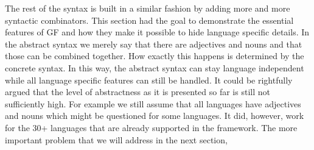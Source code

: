 \documentclass[output=paper]{LSP/langsci}
\begin{document}
\ili{}
The\ili{} rest\ili{} of\ili{} the\ili{} syntax\ili{} is\ili{} built\ili{} in\ili{} a\ili{} similar\ili{} fashion\ili{} by\ili{} adding\ili{} more\ili{} \ili{}
and\ili{} more\ili{} syntactic\ili{} combinators\ili{}.\ili{} This\ili{} section\ili{} had\ili{} the\ili{} goal\ili{} to\ili{} demonstrate\ili{}
the\ili{} essential\ili{} features\ili{} of\ili{} GF\ili{} and\ili{} how\ili{} they\ili{} make\ili{} it\ili{} possible\ili{} to\ili{} \ili{}
hide\ili{} language\ili{} specific\ili{} details\ili{}.\ili{} In\ili{} the\ili{} abstract\ili{} syntax\ili{} we\ili{} merely\ili{} \ili{}
say\ili{} that\ili{} there\ili{} are\ili{} adjectives\ili{} and\ili{} nouns\ili{} and\ili{} that\ili{} those\ili{} \ili{}
can\ili{} be\ili{} combined\ili{} together\ili{}.\ili{} How\ili{} exactly\ili{} this\ili{} happens\ili{} is\ili{} determined\ili{} by\ili{} \ili{}
the\ili{} concrete\ili{} syntax\ili{}.\ili{} In\ili{} this\ili{} way\ili{},\ili{} the\ili{} abstract\ili{} syntax\ili{} \ili{}
can\ili{} stay\ili{} language\ili{} independent\ili{} while\ili{} all\ili{} language\ili{} specific\ili{} features\ili{} \ili{}
can\ili{} still\ili{} be\ili{} handled\ili{}.\ili{} It\ili{} could\ili{} be\ili{} rightfully\ili{} argued\ili{} that\ili{} \ili{}
the\ili{} level\ili{} of\ili{} abstractness\ili{} as\ili{} it\ili{} is\ili{} presented\ili{} so\ili{} far\ili{} is\ili{} still\ili{} not\ili{} \ili{}
sufficiently\ili{} high\ili{}.\ili{} For\ili{} example\ili{} we\ili{} still\ili{} assume\ili{} that\ili{} all\ili{} languages\ili{} \ili{}
have\ili{} adjectives\ili{} and\ili{} nouns\ili{} which\ili{} might\ili{} be\ili{} questioned\ili{} for\ili{} some\ili{} languages\ili{}.\ili{} \ili{}
It\ili{} did\ili{},\ili{} however\ili{},\ili{} work\ili{} for\ili{} the\ili{} 30\ili{}+\ili{} languages\ili{} that\ili{} are\ili{} already\ili{} supported\ili{} \ili{}
in\ili{} the\ili{} framework\ili{}.\ili{} \ili{}
\ili{}%
\ili{}%
\ili{}%
\ili{}%
The\ili{} more\ili{} important\ili{} problem\ili{} that\ili{} we\ili{} will\ili{} address\ili{} in\ili{} the\ili{} next\ili{} section\ili{},\ili{} \ili{}
\end{document}
